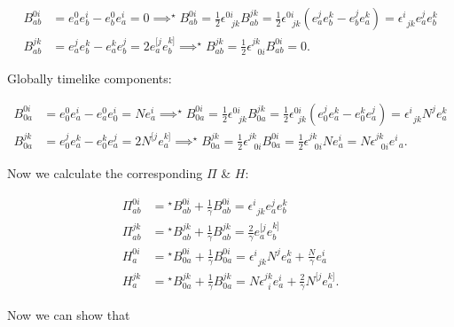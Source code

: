 \documentclass{article}
\begin{document}
$$
\begin{aligned}
B^{0i}_{ab} &= e^0_a e^i_b - e^0_b e^i_a = 0 \implies ^\star B^{0i}_{ab} = \frac{1}{2} \epsilon_{\ \ \ jk}^{0i} B^{jk}_{ab} = \frac{1}{2} \epsilon^{0i}_{\ \ \ jk} (e^j_a e^k_b - e^j_b e^k_a) = \epsilon^{i}_{\ \ jk} e^j_a e^k_b \\
B^{jk}_{ab} &= e^j_a e^k_b - e^k_a e^j_b = 2 e^{[j}_a e^{k]}_b \implies ^\star B^{jk}_{ab} = \frac{1}{2} \epsilon^{jk}_{\ \ \ 0i} B^{0i}_{ab} = 0.
\end{aligned}
$$

Globally timelike components:

$$
\begin{aligned}
B^{0i}_{0a} &= e^0_0 e^i_a - e^0_a e^i_0 = N e^i_a \implies ^\star B^{0i}_{0a} = \frac{1}{2} \epsilon_{\ \ \ jk}^{0i} B^{jk}_{0a} = \frac{1}{2} \epsilon^{0i}_{\ \ jk} (e^j_0 e^k_a - e^k_0 e^j_a) = \epsilon^{i}_{\ \ jk} N^j e^k_a \\
B^{jk}_{0a} &= e^j_0 e^k_a - e^k_0 e^j_a = 2 N^{[j} e^{k]}_a \implies ^\star B^{jk}_{0a} = \frac{1}{2} \epsilon^{jk}_{\ \ \ 0i} B^{0i}_{0a} = \frac{1}{2} \epsilon^{jk}_{\ \ \ 0i} N e^i_a = N \epsilon^{jk}_{\ \ \ 0i} e^{i}_{\ \ a}.
\end{aligned}
$$

Now we calculate the corresponding $\Pi$ \& $H$:

$$
\begin{aligned}
\Pi^{0i}_{ab} &= {}^\star B^{0i}_{ab} + \frac{1}{\gamma} B^{0i}_{ab} = \epsilon^{i}_{\ \ jk} e^{j}_{a} e^{k}_{b} \\
\Pi^{jk}_{ab} &= {}^\star B^{jk}_{ab} + \frac{1}{\gamma} B^{jk}_{ab} = \frac{2}{\gamma} e^{[j}_{a} e^{k]}_{b} \\
H^{0i}_{a} &= {}^\star B^{0i}_{0a} + \frac{1}{\gamma} B^{0i}_{0a} = \epsilon^{i}_{\ \ jk} N^{j} e^{k}_{a} + \frac{N}{\gamma} e^{i}_{a} \\
H^{jk}_{a} &= {}^\star B^{jk}_{0a} + \frac{1}{\gamma} B^{jk}_{0a} = N \epsilon_{\ \ i}^{jk} e^{i}_{a} + \frac{2}{\gamma} N^{[j} e^{k]}_{a}.
\end{aligned}
$$

Now we can show that
\end{document}
